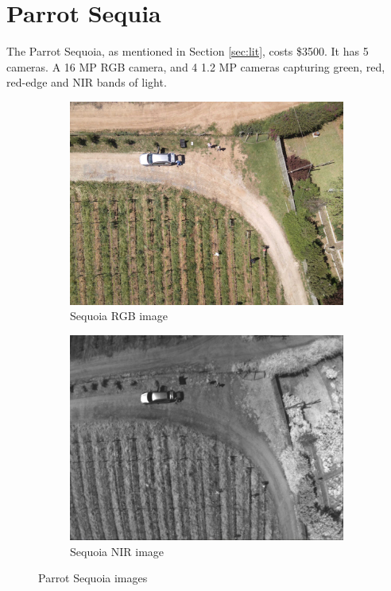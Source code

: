 %
%

\section{Parrot Sequia}

The Parrot Sequoia, as mentioned in Section \ref{sec:lit}, costs \$3500. It has 5 cameras. A 16 MP RGB camera, and 4 1.2 MP cameras capturing green, red, red-edge and NIR bands of light.

\begin{figure}[H]
\begin{subfigure}{0.5\textwidth}
\centering
\includegraphics[scale=0.11]{images/sequoia_rgb.jpg}
\caption{Sequoia RGB image}
\end{subfigure}
\begin{subfigure}{0.5\textwidth}
\centering
\includegraphics[scale=0.2]{images/sequoia_nir.jpg}
\caption{Sequoia NIR image}
\end{subfigure}
\caption{Parrot Sequoia images}
\label{fig:sequoia}
\end{figure}

